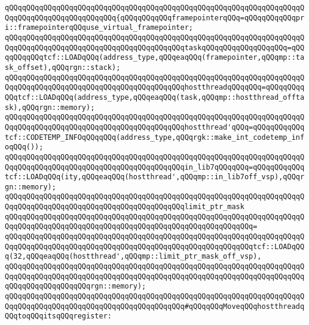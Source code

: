 \verb|qQQqqQQqqQQqqQQqqQQqqQQqqQQqqQQqqQQqqQQqqQQqqQQqqQQqqQQqqQQqqQQqqQQqqQQqqQQqqQQqqQQqqQQqqQQqqQQq{qQQqqQQqqQQqframepointerqQQq=qQQqqQQqqQQqpri::framepointerqQQquse_virtual_framepointer;|\newline
\newline
\verb|qQQqqQQqqQQqqQQqqQQqqQQqqQQqqQQqqQQqqQQqqQQqqQQqqQQqqQQqqQQqqQQqqQQqqQQqqQQqqQQqqQQqqQQqqQQqqQQqqQQqqQQqqQQqqQQqtaskqQQqqQQqqQQqqQQqqQQq=qQQqqQQqqQQqtcf::LOADqQQq(address_type,qQQqeaqQQq(framepointer,qQQqmp::task_offset),qQQqrgn::stack);|\newline
\newline
\verb|qQQqqQQqqQQqqQQqqQQqqQQqqQQqqQQqqQQqqQQqqQQqqQQqqQQqqQQqqQQqqQQqqQQqqQQqqQQqqQQqqQQqqQQqqQQqqQQqqQQqqQQqqQQqqQQqhostthreadqQQqqQQq=qQQqqQQqqQQqtcf::LOADqQQq(address_type,qQQqeaqQQq(task,qQQqmp::hostthread_offtask),qQQqrgn::memory);|\newline
\verb|qQQqqQQqqQQqqQQqqQQqqQQqqQQqqQQqqQQqqQQqqQQqqQQqqQQqqQQqqQQqqQQqqQQqqQQqqQQqqQQqqQQqqQQqqQQqqQQqqQQqqQQqqQQqqQQqhostthread'qQQq=qQQqqQQqqQQqtcf::CODETEMP_INFOqQQqqQQq(address_type,qQQqrgk::make_int_codetemp_infoqQQq());|\newline
\newline
\verb|qQQqqQQqqQQqqQQqqQQqqQQqqQQqqQQqqQQqqQQqqQQqqQQqqQQqqQQqqQQqqQQqqQQqqQQqqQQqqQQqqQQqqQQqqQQqqQQqqQQqqQQqqQQqqQQqin_lib7qQQqqQQq=qQQqqQQqqQQqtcf::LOADqQQq(ity,qQQqeaqQQq(hostthread',qQQqmp::in_lib7off_vsp),qQQqrgn::memory);|\newline
\newline
\verb|qQQqqQQqqQQqqQQqqQQqqQQqqQQqqQQqqQQqqQQqqQQqqQQqqQQqqQQqqQQqqQQqqQQqqQQqqQQqqQQqqQQqqQQqqQQqqQQqqQQqqQQqqQQqqQQqlimit_ptr_mask|\newline
\verb|qQQqqQQqqQQqqQQqqQQqqQQqqQQqqQQqqQQqqQQqqQQqqQQqqQQqqQQqqQQqqQQqqQQqqQQqqQQqqQQqqQQqqQQqqQQqqQQqqQQqqQQqqQQqqQQqqQQqqQQqqQQqqQQq=|\newline
\verb|qQQqqQQqqQQqqQQqqQQqqQQqqQQqqQQqqQQqqQQqqQQqqQQqqQQqqQQqqQQqqQQqqQQqqQQqqQQqqQQqqQQqqQQqqQQqqQQqqQQqqQQqqQQqqQQqqQQqqQQqqQQqqQQqtcf::LOADqQQq(32,qQQqeaqQQq(hostthread',qQQqmp::limit_ptr_mask_off_vsp),|\newline
\verb|qQQqqQQqqQQqqQQqqQQqqQQqqQQqqQQqqQQqqQQqqQQqqQQqqQQqqQQqqQQqqQQqqQQqqQQqqQQqqQQqqQQqqQQqqQQqqQQqqQQqqQQqqQQqqQQqqQQqqQQqqQQqqQQqqQQqqQQqqQQqqQQqqQQqqQQqqQQqqQQqrgn::memory);|\newline
\newline
\verb|qQQqqQQqqQQqqQQqqQQqqQQqqQQqqQQqqQQqqQQqqQQqqQQqqQQqqQQqqQQqqQQqqQQqqQQqqQQqqQQqqQQqqQQqqQQqqQQqqQQqqQQqqQQqqQQq#qQQqqQQqMoveqQQqhostthreadqQQqtoqQQqitsqQQqregister:|\newline
